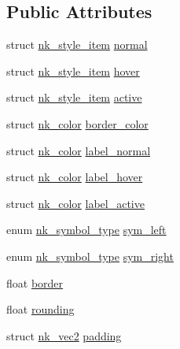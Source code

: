 \subsection*{Public Attributes}
\begin{DoxyCompactItemize}
\item 
struct \mbox{\hyperlink{structnk__style__item}{nk\+\_\+style\+\_\+item}} \mbox{\hyperlink{structnk__style__property_a969cb55e5a7852e684a1c18bb7e16b51}{normal}}
\item 
struct \mbox{\hyperlink{structnk__style__item}{nk\+\_\+style\+\_\+item}} \mbox{\hyperlink{structnk__style__property_af068e57d16d3688ef77454f7ae166a67}{hover}}
\item 
struct \mbox{\hyperlink{structnk__style__item}{nk\+\_\+style\+\_\+item}} \mbox{\hyperlink{structnk__style__property_a4e3cdf1dec9c8b281cc30244c825be04}{active}}
\item 
struct \mbox{\hyperlink{structnk__color}{nk\+\_\+color}} \mbox{\hyperlink{structnk__style__property_a616ded9dc7972df5ddb93221e7490086}{border\+\_\+color}}
\item 
struct \mbox{\hyperlink{structnk__color}{nk\+\_\+color}} \mbox{\hyperlink{structnk__style__property_a85e54e299a98c3dafd8e81d604f1cb47}{label\+\_\+normal}}
\item 
struct \mbox{\hyperlink{structnk__color}{nk\+\_\+color}} \mbox{\hyperlink{structnk__style__property_a5ff989c6583f7bd8da8217ea4469bbef}{label\+\_\+hover}}
\item 
struct \mbox{\hyperlink{structnk__color}{nk\+\_\+color}} \mbox{\hyperlink{structnk__style__property_a9a36437119f317853ceb2f6cddbd9b24}{label\+\_\+active}}
\item 
enum \mbox{\hyperlink{nuklear_8h_a29b4aaa400d0ce28aea3c8c9c372ac07}{nk\+\_\+symbol\+\_\+type}} \mbox{\hyperlink{structnk__style__property_a1a3b31adbf1e81c87cc4151a8b310bd1}{sym\+\_\+left}}
\item 
enum \mbox{\hyperlink{nuklear_8h_a29b4aaa400d0ce28aea3c8c9c372ac07}{nk\+\_\+symbol\+\_\+type}} \mbox{\hyperlink{structnk__style__property_a5b4fe5f11ee366d111fab105a0961034}{sym\+\_\+right}}
\item 
float \mbox{\hyperlink{structnk__style__property_abe8322a79a6b21439701167a7c7d6aed}{border}}
\item 
float \mbox{\hyperlink{structnk__style__property_a8fa5d9ee8755ae85850fa92177aaf10c}{rounding}}
\item 
struct \mbox{\hyperlink{structnk__vec2}{nk\+\_\+vec2}} \mbox{\hyperlink{structnk__style__property_ae20b4c10acc4b3b7441f10a6132c3e17}{padding}}

\end{DoxyCompactItemize}
